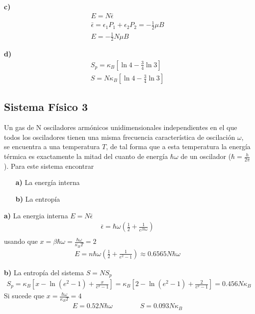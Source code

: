 \documentclass{article}
\begin{document}
\hfill 

\hfill 

\textbf{c) } 
\begin{gather*}
  E = N \bar \epsilon \\
  \bar \epsilon = \epsilon_1 P_1 + \epsilon_2 P_2 = - \frac{1}{2} \mu B \\
  E = - \frac{1}{2} N \mu B 
\end{gather*}

\hfill 

\hfill 

\textbf{d) } 
\begin{gather*}
  S_p = \kappa_B \left[\ln 4 - \frac{3}{4} \ln 3 \right] \\
  S = N \kappa_B \left[\ln 4 - \frac{3}{4} \ln 3 \right]
\end{gather*}


\subsection{Sistema Físico 3 }
Un gas de N osciladores armónicos unidimensionales independientes en el que todos los osciladores tienen una misma frecuencia característica de oscilación $ \omega $, se encuentra a una temperatura $ T  $, de tal forma que a esta temperatura la energía térmica es exactamente la mitad del cuanto de energía $ \hbar \omega $ de un oscilador ($ \hbar  = \frac{h }{2\pi} $). Para este sistema encontrar 
\begin{itemize}
  \item[\textbf{a) }] La energía interna 
  \item[\textbf{b) }] La entropía 
\end{itemize}

\hfill

\textbf{a) } La energia interna $ E = N \bar \epsilon  $ 
\begin{gather*}
  \bar \epsilon = \hbar  \omega \left(\frac{1}{2} + \frac{1}{e ^ {\beta \hbar \omega }}\right) \\
\end{gather*}
usando que $ x = \beta \hbar  \omega = \frac{\hbar  \omega}{\kappa_B T } = 2  $
\begin{gather*}
  E = n \hbar \omega \left(\frac{1}{2} + \frac{1}{e ^ {2 } - 1 }\right) \approx 0.6565 N \hbar \omega  
\end{gather*}

\hfill 

\hfill 

\textbf{b) } La entropía del sistema $ S = N S_p  $ 
\begin{gather*}
   S_p = \kappa_B \left[x - \ln(e ^ {2 } - 1 ) + \frac{x }{e ^ {2 } - 1 } \right] = \kappa_B \left[2 - \ln(e ^ {2 } - 1 ) + \frac{2 }{e ^ {2 } - 1 } \right] = 0.456 N \kappa_B 
\end{gather*}
Si sucede que $ x = \frac{\hbar \omega}{\kappa_B T } = 4  $ 
\begin{gather*}
  E = 0.52 N \hbar  \omega \qquad \qquad S = 0.093 N \kappa_B  
\end{gather*}
\end{document}
